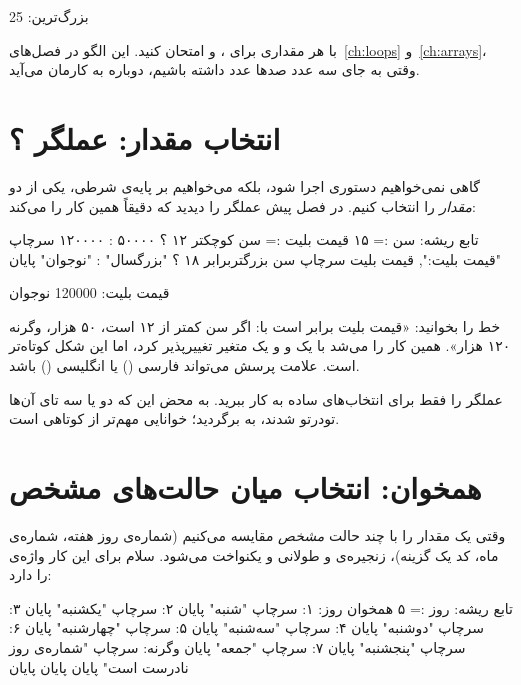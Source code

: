 \begin{outputfa}
بزرگ‌ترین: 25
\end{outputfa}

با هر مقداری برای ،  و  امتحان کنید. این
الگو در فصل‌های~\ref{ch:loops} و~\ref{ch:arrays}، وقتی به جای سه عدد صدها عدد
داشته باشیم، دوباره به کارمان می‌آید.

\section{انتخاب مقدار: عملگر ؟}

گاهی نمی‌خواهیم دستوری اجرا شود، بلکه می‌خواهیم بر پایه‌ی شرطی، یکی از دو
\emph{مقدار} را انتخاب کنیم. در فصل پیش عملگر  را
دیدید که دقیقاً همین کار را می‌کند:

\begin{salamfa}
تابع ریشه:
    سن := ۱۵
    قیمت بلیت := سن کوچکتر ۱۲ ؟ ۵۰۰۰۰ : ۱۲۰۰۰۰
    سرچاپ "قیمت بلیت:", قیمت بلیت
    سرچاپ سن بزرگتربرابر ۱۸ ؟ "بزرگسال" : "نوجوان"
پایان
\end{salamfa}

\begin{outputfa}
قیمت بلیت: 120000
نوجوان
\end{outputfa}

خط  را بخوانید:
«قیمت بلیت برابر است با: اگر سن کمتر از ۱۲ است، ۵۰ هزار، وگرنه ۱۲۰ هزار».
همین کار را می‌شد با یک  و  و یک متغیر تغییرپذیر
کرد، اما این شکل کوتاه‌تر است. علامت پرسش می‌تواند فارسی () یا
انگلیسی () باشد.

\begin{tip}
عملگر  را فقط برای انتخاب‌های ساده به کار ببرید. به محض این که
دو یا سه تای آن‌ها تودرتو شدند، به  برگردید؛ خوانایی مهم‌تر از
کوتاهی است.
\end{tip}

\section{همخوان: انتخاب میان حالت‌های مشخص}

وقتی یک مقدار را با چند حالت \emph{مشخص} مقایسه می‌کنیم (شماره‌ی روز
هفته، شماره‌ی ماه، کد یک گزینه)، زنجیره‌ی  و 
طولانی و یکنواخت می‌شود. سلام برای این کار واژه‌ی  را دارد:

\begin{salamfa}
تابع ریشه:
    روز := ۵
    همخوان روز:
        ۱: سرچاپ "شنبه" پایان
        ۲: سرچاپ "یکشنبه" پایان
        ۳: سرچاپ "دوشنبه" پایان
        ۴: سرچاپ "سه‌شنبه" پایان
        ۵: سرچاپ "چهارشنبه" پایان
        ۶: سرچاپ "پنجشنبه" پایان
        ۷: سرچاپ "جمعه" پایان
        وگرنه: سرچاپ "شماره‌ی روز نادرست است" پایان
    پایان
پایان
\end{salamfa}

